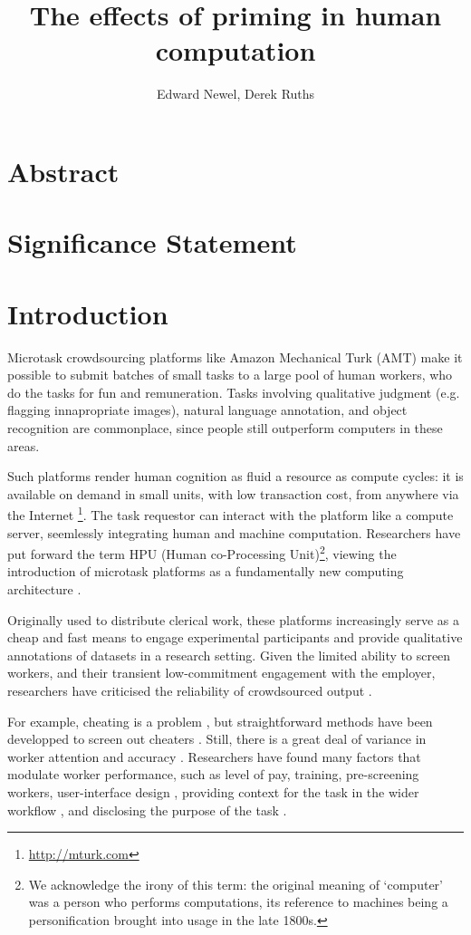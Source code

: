 \documentclass[a4paper]{report}
\title{The effects of priming in human computation}
\author{Edward Newel, Derek Ruths}
\begin{document}
\maketitle
\section*{Abstract}
\section*{Significance Statement}
\section*{Introduction}

Microtask crowdsourcing platforms like Amazon Mechanical Turk (AMT) make it 
possible to submit batches of small tasks to a large pool of human workers, 
who do the tasks for fun and remuneration.  Tasks involving qualitative
judgment (e.g. flagging innapropriate images), natural language annotation,
and object recognition are commonplace, since people still outperform  
computers in these areas.

Such platforms render human cognition as fluid a resource as compute cycles: 
it is available on demand in small units, with low transaction cost, from 
anywhere via the Internet \footnote{\href{http://mturk.com}{http://mturk.com}}.
The task requestor can interact with the platform like a compute server, 
seemlessly 
integrating human and machine computation.  Researchers have put forward the 
term HPU (Human co-Processing Unit)\footnote{We acknowledge the irony of this 
term: the original meaning of `computer' was a person who performs 
computations, its reference to machines being a personification brought into 
usage in the late 1800s\cite{Dictionary:hl}.}, viewing the introduction of 
microtask platforms as a fundamentally new computing architecture
\cite{5543192}.  

Originally used to distribute clerical work, these platforms 
increasingly serve as a cheap and fast means to engage experimental 
participants and provide qualitative annotations of datasets in a research 
setting.  Given the limited ability to screen workers, and their transient 
low-commitment engagement with the employer, researchers have criticised the
reliability of crowdsourced output \cite{marsden2009crowdsourcing}.  

For 
example, cheating
is a problem \cite{lease2011quality}, but straightforward methods have been 
developped to screen out cheaters \cite{snow2008cheap, kazai2013analysis}.
Still, there is a great deal of variance in worker attention and 
accuracy \cite{kazai2013analysis}.  Researchers have found many factors that 
modulate worker performance, such as level of pay\cite{kazai2013analysis}, 
training\cite{le2010ensuring}, pre-screening 
workers\cite{paolacci2010running},  user-interface design
\cite{Finnerty2013}, providing context for the task in the wider workflow
\cite{Kinnaird2012281}, and disclosing the purpose of the task 
\cite{chandler2013breaking}.
\end{document}
